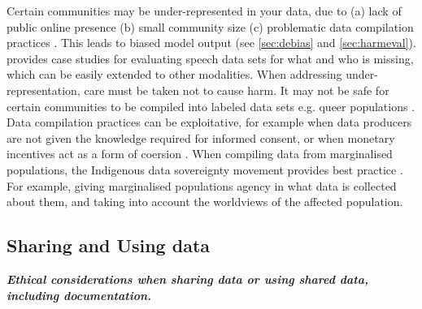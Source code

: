 Certain communities may be under-represented in your data, due to (a) lack of public online presence (b) small community size (c) problematic data compilation practices \citep{guyan_constructing_2021}. This leads to biased model output (see \cref{sec:debias} and \cref{sec:harmeval}). \citet{markl_mind_2022} provides case studies for evaluating speech data sets for what and who is missing, which can be easily extended to other modalities. When addressing under-representation, care must be taken not to cause harm. It may not be safe for certain communities to be compiled into labeled data sets e.g. queer populations \citep{ungless_stereotypes_2023, sigurgeirsson_just_2024}. Data compilation practices can be exploitative, for example when data producers are not given the knowledge required for informed consent, or when monetary incentives act as a form of coersion \citep{fussell_how_2019, reid_ethics_2021, mahelona_openais_2023}. When compiling data from marginalised populations, the Indigenous data sovereignty movement provides best practice \citep{walter_indigenous_2021}. For example, giving marginalised populations agency in what data is collected about them, and taking into account the worldviews of the affected population. %


\subsection{Sharing and Using data}\label{subsec:share}\noindent\textbf{\textit{Ethical considerations when sharing data or using shared data, including documentation.}}
\newline 

